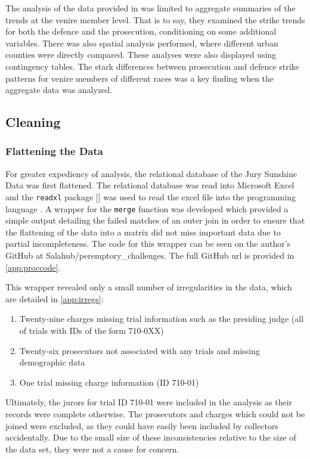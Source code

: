 The analysis of the data provided in \cite{JurySunshineProj} was limited to aggregate summaries of the trends at the venire
member level. That is to say, they examined the strike trends for both the defence and the prosecution, conditioning on some
additional variables. There was also spatial analysis performed, where different urban counties were directly compared. These
analyses were also displayed using contingency tables. The stark differences between prosecution and defence strike patterns
for venire members of different races was a key finding when the aggregate data was analyzed.

\subsection{Cleaning}

\subsubsection{Flattening the Data}

For greater expediency of analysis, the relational database of the Jury Sunshine Data was first flattened. The relational database
was read into Microsoft Excel and the \texttt{readxl} package [\cite{readxl}] was used to read the excel file into the programming
language \Rp. A wrapper for the \texttt{merge} function was developed
which provided a simple output detailing the failed
matches of an outer join in order to ensure that the flattening of the data into a matrix did not miss important data due to
partial incompleteness. The code for this wrapper can be seen on the author's GitHub at Salahub/peremptory\_challenges. The full
GitHub url is provided in \ref{app:proccode}.

This wrapper revealed only a small number of irregularities in the data, which are detailed in \ref{app:irregs}:

\begin{enumerate}
\item Twenty-nine charges missing trial information such as the presiding judge (all of trials with IDs of the form 710-0XX)
\item Twenty-six prosecutors not associated with any trials and missing demographic data
\item One trial missing charge information (ID 710-01)
\end{enumerate}

Ultimately, the jurors for trial ID 710-01 were included in the analysis as their records were
complete otherwise. The prosecutors and charges which could not be joined were excluded, as they could
have easily been included by collectors accidentally. Due to the small size of these inconsistencies relative to the size
of the data set, they were not a cause for concern.

